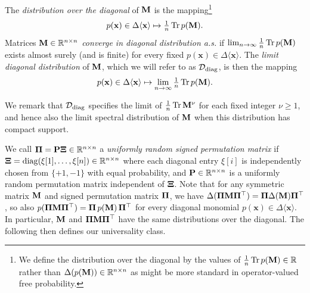 \documentclass[10pt,reqno]{amsart}
\def\x{\mathbf{x}}
\def\R{\mathbb{R}}
\def\diag{\operatorname{diag}}
\def\bx{\mathbf{x}}
\def\Tr{\operatorname{Tr}}
\newcommand{\tdiag}{\mathrm{diag}}
\begin{document}
\begin{definition}\label{def:diagdistr}
The \emph{distribution over the diagonal} of $\mathbf{M}$ is the mapping\footnote{We
define the distribution over the diagonal by the values of
$\tfrac{1}{n} \Tr p(\bM) \in \R$ rather than $\Delta(p(\bM)) \in \R^{n \times
n}$ as might be more standard in operator-valued free probability.}
\begin{align*}
p(\bx) \in \Delta \langle \bx \rangle \mapsto \tfrac{1}{n} \Tr p(\bM).
\end{align*}
Matrices $\bM \in \R^{n \times n}$ \emph{converge in diagonal distribution a.s.}
if $\lim_{n \to \infty} \tfrac{1}{n} \Tr p(\bM)$ exists almost surely
(and is finite) for every fixed $p(\bx) \in \Delta \langle \x \rangle$.
The \emph{limit diagonal distribution} of $\mathbf{M}$, which we will refer to as
$\cD_\tdiag$, is then the mapping
\begin{align*}
p(\bx) \in \Delta\langle\bx\rangle \mapsto
\lim_{n\to\infty} \tfrac{1}{n} \Tr p(\bM).
\end{align*}
\end{definition} 

We remark that $\cD_\tdiag$ specifies the limit of
$\tfrac{1}{n} \Tr \bM^\nu$ for each fixed integer $\nu \geq 1$,
and hence also the limit spectral distribution
of $\mathbf{M}$ when this distribution has compact support.

We call $\bPi=\bP\bXi \in
\R^{n \times n}$ a \emph{uniformly random signed permutation matrix} if
$\bXi=\diag(\xi[1],\ldots,\xi[n]) \in \R^{n \times n}$ where each diagonal entry 
$\xi[i]$ is independently chosen from $\{+1,-1\}$ with equal probability, and 
$\bP \in \R^{n \times n}$ is
a uniformly random permutation matrix independent of $\bm{\Xi}$.
Note that for any symmetric matrix $\mathbf{M}$
and signed permutation matrix
$\bm{\Pi}$, we have $\Delta(\bm{\Pi}\mathbf{M}\bm{\Pi}^\top)=\bm{\Pi}\Delta(\mathbf{M})\bm{\Pi}^\top$, so also
$p(\bm{\Pi}\mathbf{M}\bm{\Pi}^\top)=\bm{\Pi}\,p(\mathbf{M})\,\bm{\Pi}^\top$ for every diagonal monomial
$p(\bx) \in \Delta\langle \bx \rangle$. In particular, $\mathbf{M}$ and
$\bm{\Pi}\mathbf{M}\bm{\Pi}^\top$ have the same distributions over the diagonal.
The following then defines our universality class.
\end{document}
